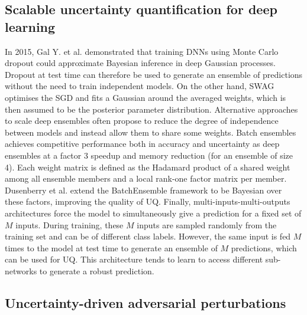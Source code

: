 \subsection{Scalable uncertainty quantification for deep learning} \label{model:scalable-DL}

In 2015, Gal Y. et al.\cite{dropoutDeepNets} demonstrated that training DNNs using Monte Carlo dropout could approximate Bayesian inference in deep Gaussian processes. Dropout at test time can therefore be used to generate an ensemble of predictions without the need to train independent models. On the other hand, SWAG\cite{SWAG} optimises the SGD and fits a Gaussian around the averaged weights, which is then assumed to be the posterior parameter distribution.
Alternative approaches to scale deep ensembles often propose to reduce the degree of independence between models and instead allow them to share some weights. Batch ensembles\cite{batchEnsemble} achieves competitive performance both in accuracy and uncertainty as deep ensembles at a factor 3 speedup and memory reduction (for an ensemble of size 4). Each weight matrix is defined as the Hadamard product of a shared weight among all ensemble members and a local rank-one factor matrix per member. Dusenberry et al.\cite{rank1BNN} extend the BatchEnsemble framework to be Bayesian over these factors, improving the quality of UQ. Finally, multi-inputs-multi-outputs\cite{MIMOEnsembles} architectures force the model to simultaneously give a prediction for a fixed set of $M$ inputs. During training, these $M$ inputs are sampled randomly from the training set and can be of different class labels. However, the same input is fed $M$ times to the model at test time to generate an ensemble of $M$ predictions, which can be used for UQ. This architecture tends to learn to access different sub-networks to generate a robust prediction.

\subsection{Uncertainty-driven adversarial perturbations} \label{model:udp}

